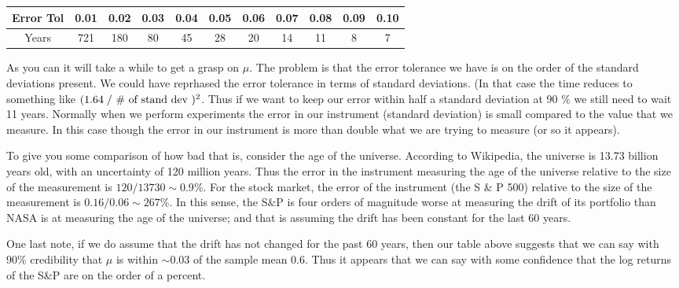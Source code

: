 \documentclass{report}
\begin{document}
\begin{center}
\begin{tabular}{ c | c | c | c | c | c | c | c | c | c | c }
Error Tol & 0.01 & 0.02 & 0.03 & 0.04 & 0.05 & 0.06 & 0.07 & 0.08 &
0.09 & 0.10 \\ \hline
Years & 721 & 180 & 80 & 45 & 28 & 20 & 14 & 11 & 8 & 7
\end{tabular}
\end{center}

As you can it will take a while to get a grasp on $\mu$.  The problem
is that the error tolerance we have is on the order of the standard
deviations present.  We could have reprhased the error tolerance in
terms of standard deviations.  (In that case the time reduces to
something like $(1.64 \; / \textmd{ \# of stand dev })^2$.  Thus if we
want to keep our error within half a standard deviation at 90 \% we
still need to wait 11 years.  Normally when we perform experiments the
error in our instrument (standard deviation) is small compared to the
value that we measure.  In this case though the error in our
instrument is more than double what we are trying to measure (or so it
appears).

To give you some comparison of how bad that is, consider the age of
the universe.  According to Wikipedia, the universe is 13.73 billion
years old, with an uncertainty of 120 million years.  Thus the error
in the instrument measuring the age of the universe relative to the
size of the measurement is $120/13730 \sim 0.9 \%$.  For the stock
market, the error of the instrument (the S \& P 500) relative to the
size of the measurement is $0.16/0.06 \sim 267 \% $.  In this sense,
the S\&P is four orders of magnitude worse at measuring the drift of
its portfolio than NASA is at measuring the age of the universe; and
that is assuming the drift has been constant for the last 60 years.

One last note, if we do assume that the drift has not changed for the
past 60 years, then our table above suggests that we can say with 90\%
credibility that $\mu$ is within $\sim 0.03$ of the sample mean $0.6$. 
Thus it appears that we can say with some confidence that the log
returns of the S\&P are on the order of a percent. 

\end{document}
